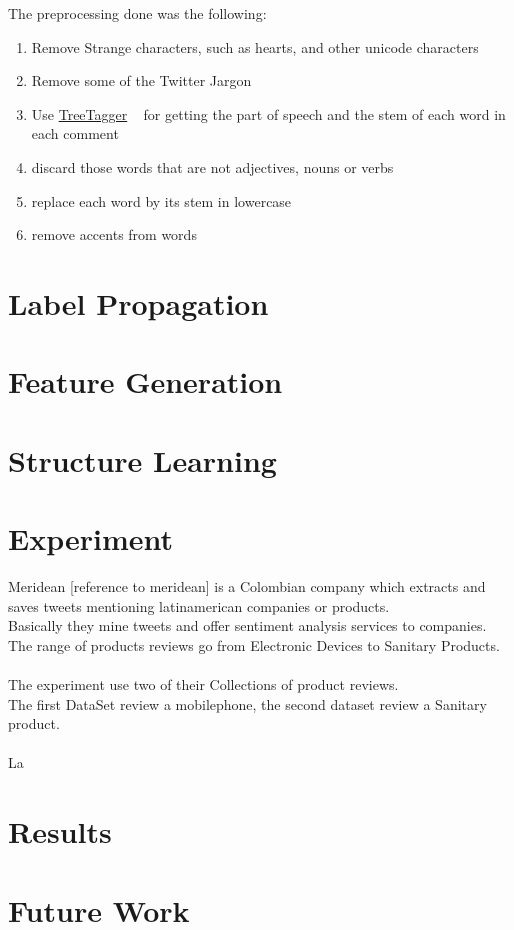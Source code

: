 \documentclass[4pt,a4paper,twocolumn]{article}
\begin{document}
The preprocessing done was the following:
\begin{enumerate}
	\item Remove Strange characters, such as hearts, and other unicode characters
	\item Remove some of the Twitter Jargon 
	\item Use \href{http://www.ims.uni-stuttgart.de/projekte/corplex/TreeTagger/}{TreeTagger} ~\cite{Schmid94probabilisticpart-of-speech} for getting the part of speech and the stem of each word in each comment
	\item discard those words that are not adjectives, nouns or verbs
	\item replace each word by its stem in lowercase
	\item remove accents from words
\end{enumerate}

\part*{Label Propagation}


\part*{Feature Generation}
\part*{Structure Learning}

\part*{Experiment}
Meridean [reference to meridean] is a Colombian company which extracts and saves tweets
mentioning latinamerican companies or products.\\
Basically they mine  tweets and offer sentiment analysis services to companies.\\
The range of products reviews go from Electronic Devices to Sanitary Products.\\
\\
The experiment use two of their Collections of product reviews.\\
The first DataSet review a mobilephone, the second dataset review a Sanitary product.\\
\\
La

\part*{Results}

\part*{Future Work}

{}

\end{document}
